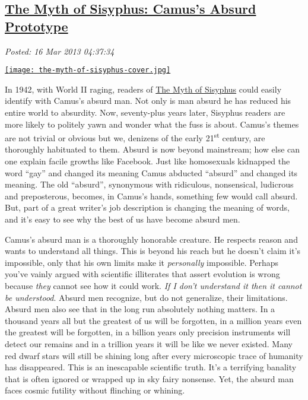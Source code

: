 %

\subsection*{\href{http://bakerjd99.wordpress.com/2013/03/15/the-myth-of-sisyphus-camuss-absurd-prototype/}{The Myth of Sisyphus: Camus's Absurd Prototype}}


\noindent\emph{Posted: 16 Mar 2013 04:37:34}
\vspace{6pt}

\captionsetup[floatingfigure]{labelformat=empty}

\begin{floatingfigure}[l]{0.24\textwidth}
\centering
\href{http://www.amazon.com/Myth-Sisyphus-Other-Essays/dp/0679733736}{\texttt{[image: the-myth-of-sisyphus-cover.jpg]}}
\label{fig:3844X0}
\end{floatingfigure} In 1942, with World II raging, readers of
\href{http://www.amazon.com/Myth-Sisyphus-Other-Essays/dp/0679733736}{The
Myth of Sisyphus} could easily identify with Camus's absurd man. Not
only is man absurd he has reduced his entire world to absurdity. Now,
seventy-plus years later, Sisyphus readers are more likely to politely
yawn and wonder what the fuss is about. Camus's themes are not trivial
or obvious but we, denizens of the early 21\textsuperscript{st} century,
are thoroughly habituated to them. Absurd is now beyond mainstream; how
else can one explain facile growths like Facebook. Just like homosexuals
kidnapped the word ``gay'' and changed its meaning Camus abducted
``absurd'' and changed its meaning. The old ``absurd'', synonymous with
ridiculous, nonsensical, ludicrous and preposterous, becomes, in Camus's
hands, something few would call absurd. But, part of a great writer's
job description is changing the meaning of words, and it's easy to see
why the best of us have become absurd men.

Camus's absurd man is a thoroughly honorable creature. He respects
reason and wants to understand all things. This is beyond his reach but
he doesn't claim it's impossible, only that his own limits make it
\emph{personally} impossible. Perhaps you've vainly argued with
scientific illiterates that assert evolution is wrong because
\emph{they} cannot see how it could work. \emph{If I don't understand it
then it cannot be understood}. Absurd men recognize, but do not
generalize, their limitations. Absurd men also see that in the long run
absolutely nothing matters. In a thousand years all but the greatest of
us will be forgotten, in a million years even the greatest will be
forgotten, in a billion years only precision instruments will detect our
remains and in a trillion years it will be like we never existed. Many
red dwarf stars will still be shining long after every microscopic trace
of humanity has disappeared. This is an inescapable scientific truth.
It's a terrifying banality that is often ignored or wrapped up in sky
fairy nonsense. Yet, the absurd man faces cosmic futility without
flinching or whining.

